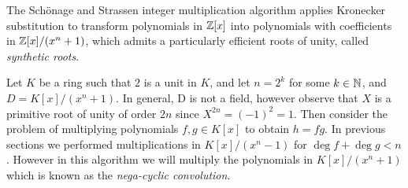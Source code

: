 The Sch\"{o}nage and Strassen integer multiplication algorithm applies Kronecker substitution to transform polynomials in ${\mathbb Z}[x]$ into polynomials with coefficients in ${\mathbb Z}[x]/(x^n + 1)$, which admits a particularly efficient roots of unity, called \emph{synthetic roots}.


Let $K$ be a ring such that $2$ is a unit in $K$, and let $n = 2^k$ for some $k \in {\mathbb N}$, and $D = K[x] / (x^n + 1)$. In general, D is not a field, however observe that $X$ is a primitive root of unity of order $2n$ since $X^{2n} = (-1)^2 = 1$. Then consider the problem of multiplying polynomials $f, g \in K[x]$ to obtain $h = fg$. In previous sections we performed multiplications in $K[x]/(x^n - 1)$ for $\deg f + \deg g < n$. However in this algorithm we will multiply the polynomials in $K[x]/(x^n + 1)$ which is known as the \textit{nega-cyclic convolution}. 

